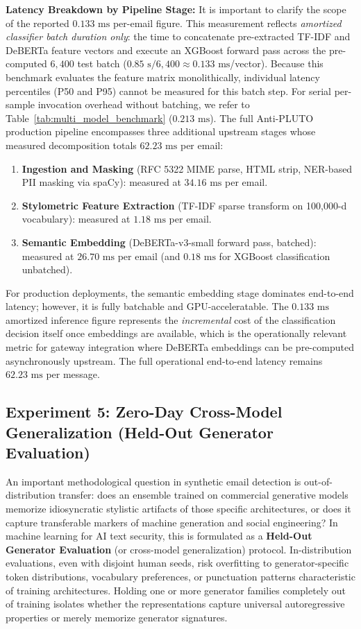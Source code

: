 \documentclass[journal]{IEEEtran}
\begin{document}
\textbf{Latency Breakdown by Pipeline Stage:} It is important to clarify the scope of the reported $0.133\text{ ms}$ per-email figure. This measurement reflects \emph{amortized classifier batch duration only}: the time to concatenate pre-extracted TF-IDF and DeBERTa feature vectors and execute an XGBoost forward pass across the pre-computed $6{,}400$ test batch ($0.85\text{ s} / 6{,}400 \approx 0.133\text{ ms}$/vector). Because this benchmark evaluates the feature matrix monolithically, individual latency percentiles (P50 and P95) cannot be measured for this batch step. For serial per-sample invocation overhead without batching, we refer to Table~\ref{tab:multi_model_benchmark} ($0.213\text{ ms}$). The full Anti-PLUTO production pipeline encompasses three additional upstream stages whose measured decomposition totals $62.23\text{ ms}$ per email:
\begin{enumerate}
    \item \textbf{Ingestion and Masking} (RFC 5322 MIME parse, HTML strip, NER-based PII masking via spaCy): measured at $34.16\text{ ms}$ per email.
    \item \textbf{Stylometric Feature Extraction} (TF-IDF sparse transform on 100,000-d vocabulary): measured at $1.18\text{ ms}$ per email.
    \item \textbf{Semantic Embedding} (DeBERTa-v3-small forward pass, batched): measured at $26.70\text{ ms}$ per email (and $0.18\text{ ms}$ for XGBoost classification unbatched).
\end{enumerate}
For production deployments, the semantic embedding stage dominates end-to-end latency; however, it is fully batchable and GPU-acceleratable. The $0.133\text{ ms}$ amortized inference figure represents the \emph{incremental} cost of the classification decision itself once embeddings are available, which is the operationally relevant metric for gateway integration where DeBERTa embeddings can be pre-computed asynchronously upstream. The full operational end-to-end latency remains $62.23\text{ ms}$ per message.

\subsection{Experiment 5: Zero-Day Cross-Model Generalization (Held-Out Generator Evaluation)}
\label{sec:zero_day}

An important methodological question in synthetic email detection is out-of-distribution transfer: does an ensemble trained on commercial generative models memorize idiosyncratic stylistic artifacts of those specific architectures, or does it capture transferable markers of machine generation and social engineering? In machine learning for AI text security, this is formulated as a \textbf{Held-Out Generator Evaluation} (or cross-model generalization) protocol. In-distribution evaluations, even with disjoint human seeds, risk overfitting to generator-specific token distributions, vocabulary preferences, or punctuation patterns characteristic of training architectures. Holding one or more generator families completely out of training isolates whether the representations capture universal autoregressive properties or merely memorize generator signatures.
\end{document}
